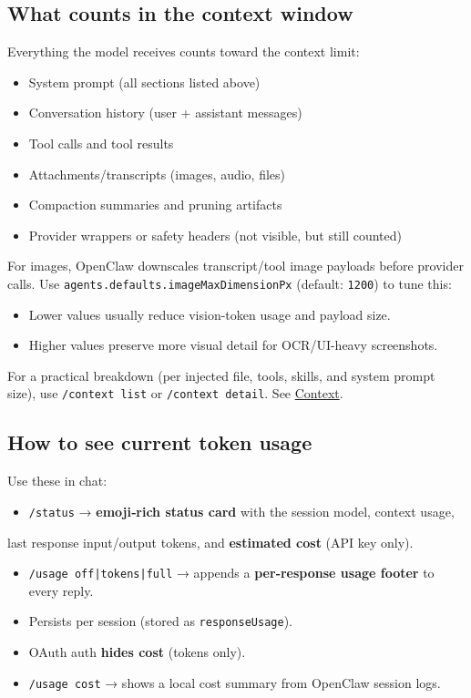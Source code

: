 \subsection{What counts in the context window}


Everything the model receives counts toward the context limit:

\begin{itemize}
  \item System prompt (all sections listed above)
  \item Conversation history (user + assistant messages)
  \item Tool calls and tool results
  \item Attachments/transcripts (images, audio, files)
  \item Compaction summaries and pruning artifacts
  \item Provider wrappers or safety headers (not visible, but still counted)
\end{itemize}


For images, OpenClaw downscales transcript/tool image payloads before provider calls.
Use \texttt{agents.defaults.imageMaxDimensionPx} (default: \texttt{1200}) to tune this:

\begin{itemize}
  \item Lower values usually reduce vision-token usage and payload size.
  \item Higher values preserve more visual detail for OCR/UI-heavy screenshots.
\end{itemize}


For a practical breakdown (per injected file, tools, skills, and system prompt size), use \texttt{/context list} or \texttt{/context detail}. See \href{/concepts/context}{Context}.

\subsection{How to see current token usage}


Use these in chat:

\begin{itemize}
  \item \texttt{/status} → \textbf{emoji‑rich status card} with the session model, context usage,
\end{itemize}

last response input/output tokens, and \textbf{estimated cost} (API key only).
\begin{itemize}
  \item \texttt{/usage off|tokens|full} → appends a \textbf{per-response usage footer} to every reply.
  \item Persists per session (stored as \texttt{responseUsage}).
  \item OAuth auth \textbf{hides cost} (tokens only).
  \item \texttt{/usage cost} → shows a local cost summary from OpenClaw session logs.
\end{itemize}


